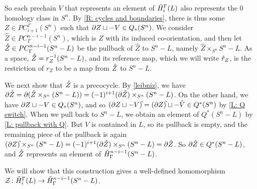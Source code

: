 So each prechain $V$ that represents an element of $\tilde H_i^\Gamma(L)$ also represents the $0$ homology class in $S^n$. By \cref{R: cycles and boundaries}, there is thus some $Z \in PC^\Gamma_{i+1}(S^n)$ such that $\partial Z \sqcup -V \in Q_*(S^n)$.
We consider $\hat Z \in PC_\Gamma^{n-i-1}(S^n)$, which is $Z$ with its induced co-orientation, and then let $\mathring{Z} \in PC_\Gamma^{n-i-1}(S^n - L)$ be the pullback of $\hat Z$ to $S^n-L$, namely $\hat Z \times_{S^n} S^n - L$.
As a space, $\mathring{Z} = r_Z^{-1}(S^n-L)$, and its reference map, which we will write $\mathring{r}_Z$, is the restriction of $r_Z$ to be a map from $\mathring{Z}$ to $S^n-L$.

We next show that $\mathring{Z}$ is a precocycle.
By \cref{leibniz}, we have $\partial{\mathring{Z}} = \partial (\hat Z \times_{S^n} (S^n - L)) = (-1)^{i+1} (\partial \hat Z) \times_{S^n} (S^n - L)$.
On the other hand, we have $\partial Z \sqcup -V \in Q_*(S^n)$, and so $(\bd Z \sqcup -V)\hat{\vrule height1.3ex width0pt} = (\bd Z)\hat{\vrule height1.3ex width0pt} \sqcup - \hat V \in Q^*(S^n)$ by \cref{L: Q switch}.
When we pull back to $S^n - L$, we obtain an element of $Q^*(S^n - L)$ by \cref{L: pullback with Q}.
But $V$ is contained in $L$, so its pullback is empty, and the remaining piece of the pullback is again
$(\bd Z)\hat{\vrule height1.3ex width0pt} \times_{S^n} (S^n - L) = (-1)^{i+1} (\bd \hat Z) \times_{S^n} (S^n - L) = \bd{\mr Z}$.
So $\partial{\mathring{Z}} \in Q^*(S^n - L)$, and $\mathring{Z}$ represents an element of $\tilde H^{n-i-1}_\Gamma(S^n - L)$.

We will show that this construction gives a well-defined homomorphism $\mathcal{Z} \colon \tilde H_i^\Gamma(L) \to \tilde H^{n-i-1}_\Gamma(S^n-L)$.



